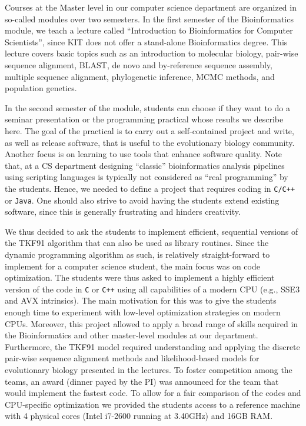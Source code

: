 \documentclass[runningheads,a4paper]{llncs}
\begin{document}
Courses at the Master level in our computer science department are organized in so-called modules over two semesters.
In the first semester of the Bioinformatics module, we teach a lecture called ``Introduction to Bioinformatics for Computer Scientists'', since KIT does not offer
a stand-alone Bioinformatics degree. This lecture covers basic topics such as an introduction to molecular biology, pair-wise sequence alignment,
BLAST, de novo and by-reference sequence assembly, multiple sequence alignment, phylogenetic inference, MCMC methods, and population genetics.

In the second semester of the module, students can choose if they want to do a seminar presentation or the programming practical whose results we describe here.
The goal of the practical is to carry out a self-contained project and write, as well as release software, that is useful to the evolutionary biology community.
Another focus is on learning to use tools that enhance software quality.
Note that, at a CS department designing ``classic'' bioinformatics analysis pipelines using scripting languages is typically not considered as ``real programming'' by the
students. Hence, we needed to define a project that requires coding in \texttt{C/C++} or \texttt{Java}.
One should also strive to avoid having the students extend existing software, since
this is generally frustrating and hinders creativity.

We thus decided to ask the students to implement efficient, sequential versions of the TKF91 algorithm that can also be used as library routines. 
Since the dynamic programming algorithm as such, is relatively straight-forward to implement for a computer science student, the main focus was on code optimization. 
The students were thus asked to implement a highly efficient version of the code in \verb|C| or \verb|C++| using all capabilities of a modern CPU (e.g., SSE3 and AVX intrinsics).
The main motivation for this was to give the students enough time to experiment with low-level optimization strategies on modern CPUs. 
Moreover, this project allowed to apply a broad range of skills acquired in the Bioinformatics and other master-level modules at our department.
Furthermore, the TKF91 model required understanding and applying the discrete pair-wise sequence alignment methods and likelihood-based models for evolutionary biology 
presented in the lectures. 
To foster competition among the teams, an award (dinner payed by the PI) was announced for the team that would implement the fastest code. 
To allow for a fair comparison of the codes and CPU-specific optimization we provided the students access to a reference machine with 4 physical cores (Intel i7-2600 running at 3.40GHz) and 
16GB RAM. 
\end{document}
